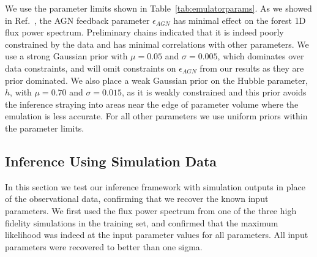 We use the parameter limits shown in Table~\ref{tab:emulatorparams}. As we showed in Ref.~\cite{2023simsuite}, the AGN feedback parameter $\epsilon_{AGN}$ has minimal effect on the \Lya forest 1D flux power spectrum. Preliminary chains indicated that it is indeed poorly constrained by the data and has minimal correlations with other parameters. We use a strong Gaussian prior with $\mu = 0.05$ and $\sigma = 0.005$, which dominates over data constraints, and will omit constraints on $\epsilon_{AGN}$ from our results as they are prior dominated. We also place a weak Gaussian prior on the Hubble parameter, $h$, with $\mu = 0.70$ and $\sigma = 0.015$, as it is weakly constrained and this prior avoids the inference straying into areas near the edge of parameter volume where the emulation is less accurate. For all other parameters we use uniform priors within the parameter limits.


\subsection{Inference Using Simulation Data}\label{sec:simdat}

In this section we test our inference framework with simulation outputs in place of the observational data, confirming that we recover the known input parameters. We first used the flux power spectrum from one of the three high fidelity simulations in the training set, and confirmed that the maximum likelihood was indeed at the input parameter values for all parameters. All input parameters were recovered to better than one sigma.

